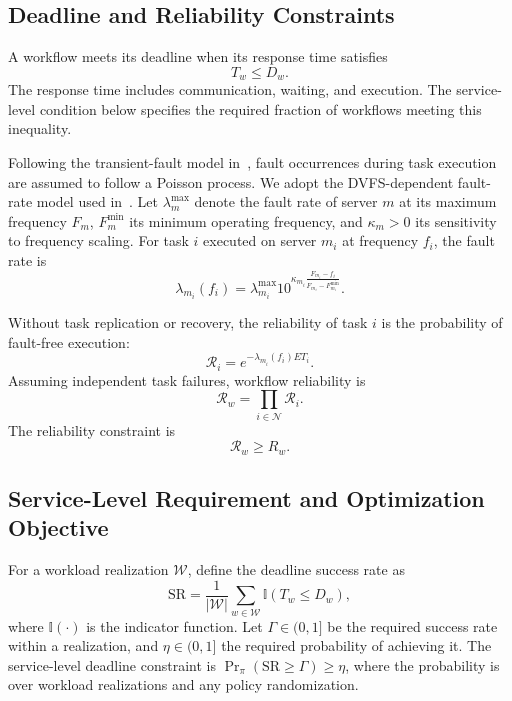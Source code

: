 \documentclass[lettersize,journal]{IEEEtran}
\newcommand{\ind}{\mathbb{I}}
\begin{document}
\subsection{Deadline and Reliability Constraints}

A workflow meets its deadline when its response time satisfies
\begin{equation}
 T_w\leq D_w.
 \label{eq:deadline_constraint}
\end{equation}
The response time includes communication, waiting, and execution.
The service-level condition below specifies the required fraction
of workflows meeting this inequality.

Following the transient-fault model in~\cite{zhu2004},
fault occurrences during task execution are assumed to
follow a Poisson process. We adopt the DVFS-dependent
fault-rate model used in~\cite{wu2018}.
Let $\lambda_m^{\max}$ denote the fault rate of server $m$
at its maximum frequency $F_m$, $F_m^{\min}$ its minimum
operating frequency, and $\kappa_m>0$ its sensitivity
to frequency scaling. For task $i$ executed on server $m_i$
at frequency $f_i$, the fault rate is
\begin{equation}
    \lambda_{m_i}(f_i)=\lambda_{m_i}^{\max}
    10^{\kappa_{m_i}
    \frac{F_{m_i}-f_i}{F_{m_i}-F_{m_i}^{\min}}}.
    \label{eq:dvfs_fault_rate}
\end{equation}

Without task replication or recovery, the reliability
of task $i$ is the probability of fault-free execution:
\begin{equation}
    \mathcal{R}_i
    =e^{-\lambda_{m_i}(f_i)ET_i}.
    \label{eq:task_reliability}
\end{equation}
Assuming independent task failures, workflow reliability is
\begin{equation}
    \mathcal{R}_w=\prod_{i\in\mathcal{N}}\mathcal{R}_i.
    \label{eq:workflow_reliability}
\end{equation}
The reliability constraint is
\begin{equation}
    \mathcal{R}_w\geq R_w.
    \label{eq:reliability_constraint}
\end{equation}


\subsection{Service-Level Requirement and Optimization Objective}
\label{subsec:objective}

For a workload realization $\mathcal W$, define the deadline success
rate as
\begin{equation}
 \mathrm{SR}=\frac{1}{|\mathcal W|}
 \sum_{w\in\mathcal W}\ind(T_w\leq D_w),
 \label{eq:success_rate}
\end{equation}
where $\ind(\cdot)$ is the indicator function. Let $\Gamma\in(0,1]$
be the required success rate within a realization, and
$\eta\in(0,1]$ the required probability of achieving it.
The service-level deadline constraint is
$\Pr_\pi(\mathrm{SR}\geq\Gamma)\geq\eta$, where the probability is
over workload realizations and any policy randomization.
\end{document}
